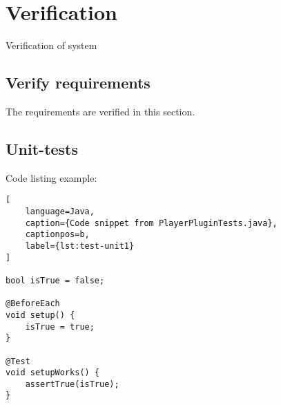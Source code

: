 \section{Verification}
Verification of system

\subsection{Verify requirements}
The requirements are verified in this section.

\subsection{Unit-tests}
Code listing example:

\begin{lstlisting}[
    language=Java,
    caption={Code snippet from PlayerPluginTests.java},
    captionpos=b,
    label={lst:test-unit1}
]

bool isTrue = false;

@BeforeEach
void setup() {
    isTrue = true;
}

@Test
void setupWorks() {
	assertTrue(isTrue);
}

\end{lstlisting}
